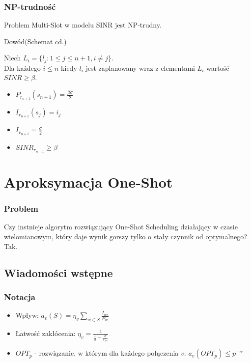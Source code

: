 \documentclass[polish, t,10pt]{beamer}
\begin{document}
\begin{frame}
    \frametitle{NP-trudność}
    \begin{theorem}
        Problem Multi-Slot w modelu SINR jest NP-trudny.
    \end{theorem}
    \begin{block}{Dowód(Schemat cd.)}
        \begin{lemma}
            Niech $L_i = \{l_j: 1 \leq j \leq n + 1, i \neq j\}$.\\
            Dla każdego $i \leq n$ kiedy $l_i$ jest zaplanowany wraz z elementami $L_i$ wartość $SINR \ge \beta$.
        \end{lemma}
        \begin{itemize}
            \item $P_{r_{n+1}}(s_{n+1}) = \frac{\beta\sigma}{2}$
            \item $I_{r_{n+1}}(s_j) = i_j$
            \item $I_{r_{n+1}} = \frac{\sigma}{2}$
            \item $SINR_{r_{n+1}} \geq \beta$
        \end{itemize}
    \end{block}
\end{frame}

\section{Aproksymacja One-Shot}
\begin{frame}
    \frametitle{Problem}
        Czy instnieje algorytm rozwiązujący One-Shot Scheduling działający w czasie wielomianowym,
        który daje wynik gorszy tylko o stały czynnik od optymalnego?
        \pause
        \vfill
        Tak.
\end{frame}

\subsection{Wiadomości wstępne}
\begin{frame}
    \frametitle{Notacja}
    \begin{itemize}
        \item Wpływ: $a_v(S) = \eta_v \sum_{w \in S} \frac{I_{wv}}{P_{vv}}$
        \item Łatwość zakłócenia: $\eta_v = \frac{1}{\frac{1}{\beta} - \frac{N}{P_{vv}}}$
        \item $OPT_p$ - rozwiązanie, w którym dla każdego połączenia $v$: $a_v(OPT_p) \le p^{-\alpha}$
    \end{itemize}
\end{frame}
\end{document}
